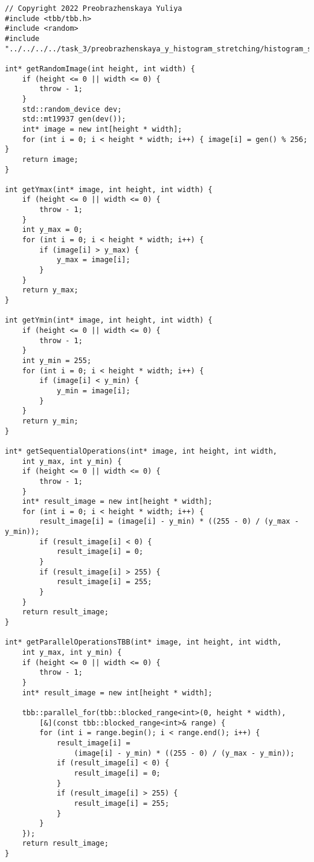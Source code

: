 \documentclass{report}
\begin{document}
\begin{lstlisting}
// Copyright 2022 Preobrazhenskaya Yuliya
#include <tbb/tbb.h>
#include <random>
#include "../../../../task_3/preobrazhenskaya_y_histogram_stretching/histogram_stretching.h"

int* getRandomImage(int height, int width) {
    if (height <= 0 || width <= 0) {
        throw - 1;
    }
    std::random_device dev;
    std::mt19937 gen(dev());
    int* image = new int[height * width];
    for (int i = 0; i < height * width; i++) { image[i] = gen() % 256; }
    return image;
}

int getYmax(int* image, int height, int width) {
    if (height <= 0 || width <= 0) {
        throw - 1;
    }
    int y_max = 0;
    for (int i = 0; i < height * width; i++) {
        if (image[i] > y_max) {
            y_max = image[i];
        }
    }
    return y_max;
}

int getYmin(int* image, int height, int width) {
    if (height <= 0 || width <= 0) {
        throw - 1;
    }
    int y_min = 255;
    for (int i = 0; i < height * width; i++) {
        if (image[i] < y_min) {
            y_min = image[i];
        }
    }
    return y_min;
}

int* getSequentialOperations(int* image, int height, int width,
    int y_max, int y_min) {
    if (height <= 0 || width <= 0) {
        throw - 1;
    }
    int* result_image = new int[height * width];
    for (int i = 0; i < height * width; i++) {
        result_image[i] = (image[i] - y_min) * ((255 - 0) / (y_max - y_min));
        if (result_image[i] < 0) {
            result_image[i] = 0;
        }
        if (result_image[i] > 255) {
            result_image[i] = 255;
        }
    }
    return result_image;
}

int* getParallelOperationsTBB(int* image, int height, int width,
    int y_max, int y_min) {
    if (height <= 0 || width <= 0) {
        throw - 1;
    }
    int* result_image = new int[height * width];

    tbb::parallel_for(tbb::blocked_range<int>(0, height * width),
        [&](const tbb::blocked_range<int>& range) {
        for (int i = range.begin(); i < range.end(); i++) {
            result_image[i] =
                (image[i] - y_min) * ((255 - 0) / (y_max - y_min));
            if (result_image[i] < 0) {
                result_image[i] = 0;
            }
            if (result_image[i] > 255) {
                result_image[i] = 255;
            }
        }
    });
    return result_image;
}
\end{lstlisting}
\end{document}
